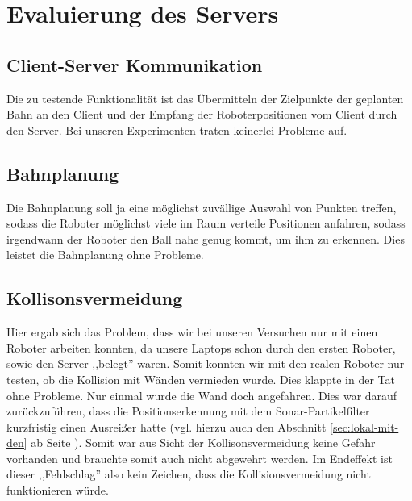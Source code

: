 \section{Evaluierung des Servers}
\label{sec:eval-des-serv}
%

%
\subsection{Client-Server Kommunikation}
Die zu testende Funktionalität ist das Übermitteln der Zielpunkte der
geplanten Bahn an den Client und der Empfang der Roboterpositionen vom
Client durch den Server. Bei unseren Experimenten traten keinerlei
Probleme auf. 
\subsection{Bahnplanung}
Die Bahnplanung soll ja eine möglichst zuvällige Auswahl von Punkten
treffen, sodass die Roboter möglichst viele im Raum verteile
Positionen anfahren, sodass irgendwann der Roboter den Ball nahe genug
kommt, um ihm zu erkennen. Dies leistet die Bahnplanung ohne Probleme.
\subsection{Kollisonsvermeidung}
Hier ergab sich das Problem, dass wir bei unseren Versuchen nur mit
einen Roboter arbeiten konnten, da unsere Laptops schon durch den
ersten Roboter, sowie den Server ,,belegt'' waren. Somit konnten wir
mit den realen Roboter nur testen, ob die Kollision mit Wänden
vermieden wurde. Dies klappte in der Tat ohne Probleme. Nur einmal
wurde die Wand doch angefahren. Dies war darauf zurückzuführen, dass
die Positionserkennung mit dem Sonar-Partikelfilter kurzfristig einen
Ausreißer hatte (vgl. hierzu auch den Abschnitt
\ref{sec:lokal-mit-den} ab Seite \pageref{sec:lokal-mit-den}). Somit
war aus Sicht der Kollisonsvermeidung keine Gefahr vorhanden und
brauchte somit auch nicht abgewehrt werden. Im Endeffekt ist dieser
,,Fehlschlag'' also kein Zeichen, dass die Kollisionsvermeidung nicht
funktionieren würde. \\\\
%

